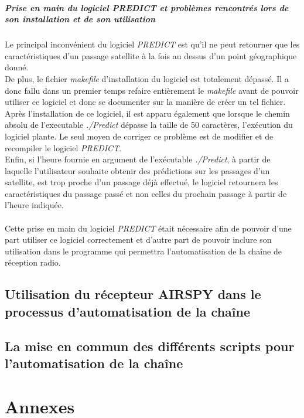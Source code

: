 \documentclass[12pt,fleqn]{book} %
\begin{document}
\subsubsection{Prise en main du logiciel PREDICT et problèmes rencontrés lors de son installation et de son utilisation}
Le principal inconvénient du logiciel \emph{PREDICT} est qu'il ne peut retourner que les caractéristiques d'un passage satellite à la fois au dessus d'un point géographique donné.  
~\\De plus, le fichier \emph{makefile} d'installation du logiciel est totalement dépassé. Il a donc fallu dans un premier temps refaire entièrement le \emph{makefile} avant de pouvoir utiliser ce logiciel et donc se documenter sur la manière de créer un tel fichier. 
~\\Après l'installation de ce logiciel, il est apparu également que lorsque le chemin absolu de l'executable \emph{./Predict} dépasse la taille de 50 caractères, l'exécution du logiciel plante. Le seul moyen de corriger ce problème est de modifier et de recompiler le logiciel \emph{PREDICT}.
~\\Enfin, si l'heure fournie en argument de l'exécutable \emph{./Predict}, à partir de laquelle l'utilisateur souhaite obtenir des prédictions sur les passages d'un satellite, est trop proche d'un passage déjà effectué, le logiciel retournera les caractéristiques du passage passé et non celles du prochain passage à partir de l'heure indiquée.
~\\\\Cette prise en main du logiciel \emph{PREDICT} était nécessaire afin de pouvoir d'une part utiliser ce logiciel correctement et d'autre part de pouvoir inclure son utilisation dans le programme qui permettra l'automatisation de la chaîne de réception radio.
\chapter{Utilisation du récepteur AIRSPY dans le processus d'automatisation de la chaîne}
\chapter{La mise en commun des différents scripts pour l'automatisation de la chaîne}




\setcounter{part}{-5}
\part{Annexes}
\end{document}
